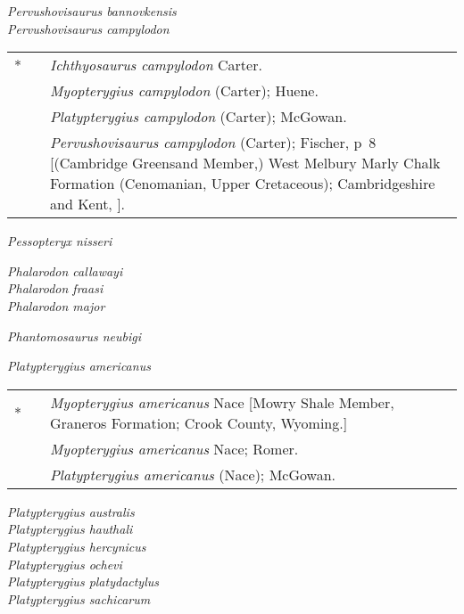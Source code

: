 \documentclass[notuftebib,font=erewhon]{tufte-lualatex}
\newenvironment*{synonymy}%
	{
		\footnotesize
		\begin{tabu}[l]{rlX}
	}%
	{
		\\
		\end{tabu}
		\normalsize
	}
\begin{document}
\emph{Pervushovisaurus bannovkensis} \cite*[Arkhangelsky,][]{Arkhangelsky1998PJ} \\
\emph{Pervushovisaurus campylodon} \parencite*[Carter,][]{Carter1846RBAAS}\\
\begin{synonymy}
	*	& \cite*{Carter1846RBAAS}	& \emph{Ichthyosaurus campylodon} Carter. \\
		& \cite*{vonHuene1922}	& \emph{Myopterygius campylodon} (Carter); Huene. \\
		& \cite*{McGowan1972CGUW}	& \emph{Platypterygius campylodon} (Carter); McGowan. \\
		& \cite*{Fischer2016P}	& \emph{Pervushovisaurus campylodon} (Carter); Fischer, p~8 [(Cambridge Greensand Member,) West Melbury Marly Chalk Formation (Cenomanian, Upper Cretaceous); Cambridgeshire and Kent, ].
\end{synonymy}

\emph{Pessopteryx nisseri} \cite*[Wiman,][]{Wiman1910BGIUa}

\emph{Phalarodon callawayi} \cite*[Schmitz et al.,][]{Schmitz2004PAP}\\
\emph{Phalarodon fraasi} \cite*[Merriam,][]{Merriam1910UCBDG}\\
\emph{Phalarodon major} \cite*[Huene,][]{vonHuene1916P}

\emph{Phantomosaurus neubigi} \parencite*[Sander,][]{Sander1997AMR}

\emph{Platypterygius americanus} \cite*[Nace,][]{Nace1939AJS}\\
\begin{synonymy}
	*	& \cite*{Nace1939AJS}	& \emph{Myopterygius americanus} Nace [Mowry Shale Member, Graneros Formation; Crook County, Wyoming.] \\
		& \cite*{Romer1968CGUW}	& \emph{Myopterygius americanus} Nace; Romer. \\
		& \cite*{McGowan1972CGUW}	& \emph{Platypterygius americanus} (Nace); McGowan.
\end{synonymy}
\emph{Platypterygius australis} \parencite*[M’Coy,][]{MCoy1867AMNH}\\
\emph{Platypterygius hauthali} \parencite*[Huene,][]{vonHuene1927ZFMGPB}\\
\emph{Platypterygius hercynicus} \cite*[Kuhn,][]{Kuhn1946BNGBb}\\
\emph{Platypterygius ochevi} \cite*[Arkhangelsky et al.,][]{Arkhangelsky2008PJ}\\
\emph{Platypterygius platydactylus} \parencite*[Broili,][]{Broili1907P}\\
\emph{Platypterygius sachicarum} \cite*[Páramo,][]{Paramo1997RI}
\end{document}
